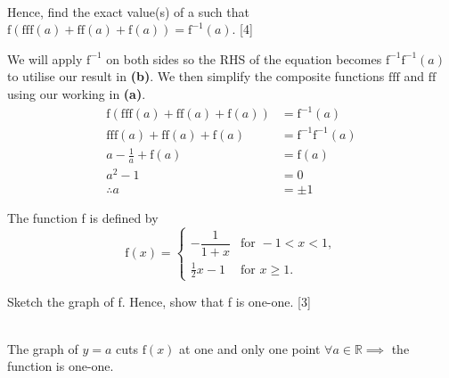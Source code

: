 \documentclass[12pt, a4 paper]{article}
\begin{document}
\begin{outline}[enumerate]
\begin{answer}
\begin{align*}
  \end{align*}
 \end{answer}
 \2 Hence, find the exact value(s) of a such that $\textrm{f}(\textrm{f}\textrm{f}\textrm{f}(a)+\textrm{f}\textrm{f}(a)+\textrm{f}(a))=\textrm{f}^{-1}(a)$. \hfill[4]
 \begin{answer}
  We will apply $\textrm{f}^{-1}$ on both sides so the RHS of the equation becomes $\textrm{f}^{-1}\textrm{f}^{-1}(a)$ to utilise our result in \textbf{(b)}. We then simplify the composite functions $\textrm{f}\textrm{f}\textrm{f}$ and $\textrm{f}\textrm{f}$ using our working in \textbf{(a)}.
  \begin{align*}
   \textrm{f}(\textrm{f}\textrm{f}\textrm{f}(a)+\textrm{f}\textrm{f}(a)+\textrm{f}(a)) & =\textrm{f}^{-1}(a)                \\
   \textrm{f}\textrm{f}\textrm{f}(a)+\textrm{f}\textrm{f}(a)+\textrm{f}(a)             & =\textrm{f}^{-1}\textrm{f}^{-1}(a) \\
   a-\frac{1}{a}+\textrm{f}(a)                                                         & =\textrm{f}(a)                     \\
   a^2-1                                                                               & =0                                 \\
   \therefore a                                                                        & =\pm 1
  \end{align*}
 \end{answer}

 \1 The function f is defined by
 \[\textrm{f}(x)=
  \begin{cases}
   -\dfrac{1}{1+x} & \textrm{for }-1<x<1, \\
   \frac{1}{2}x-1  & \textrm{for }x\geq1.
  \end{cases}
 \] %

 \2 Sketch the graph of f. Hence, show that f is one-one. \hfill[3]
 \begin{answer}
  \vspace{3mm}
  \color{black}
  \\
  \color{blue}
  The graph of $y=a$ cuts $\textrm{f}(x)$ at one and only one point $\forall a\in\mathbb{R}\implies$ the function is one-one.
 \end{answer}


\end{outline}
\end{document}
